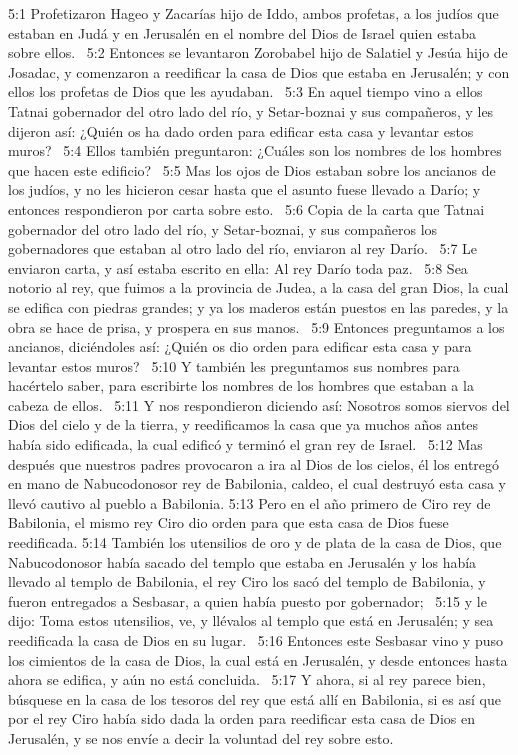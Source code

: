 5:1 Profetizaron Hageo y Zacarías hijo de Iddo, ambos profetas, a los judíos que estaban en Judá y en Jerusalén en el nombre del Dios de Israel quien estaba sobre ellos.  
5:2 Entonces se levantaron Zorobabel hijo de Salatiel y Jesúa hijo de Josadac, y comenzaron a reedificar la casa de Dios que estaba en Jerusalén; y con ellos los profetas de Dios que les ayudaban.  
5:3 En aquel tiempo vino a ellos Tatnai gobernador del otro lado del río, y Setar-boznai y sus compañeros, y les dijeron así: ¿Quién os ha dado orden para edificar esta casa y levantar estos muros?  
5:4 Ellos también preguntaron: ¿Cuáles son los nombres de los hombres que hacen este edificio?  
5:5 Mas los ojos de Dios estaban sobre los ancianos de los judíos, y no les hicieron cesar hasta que el asunto fuese llevado a Darío; y entonces respondieron por carta sobre esto.  
5:6 Copia de la carta que Tatnai gobernador del otro lado del río, y Setar-boznai, y sus compañeros los gobernadores que estaban al otro lado del río, enviaron al rey Darío.  
5:7 Le enviaron carta, y así estaba escrito en ella: Al rey Darío toda paz.  
5:8 Sea notorio al rey, que fuimos a la provincia de Judea, a la casa del gran Dios, la cual se edifica con piedras grandes; y ya los maderos están puestos en las paredes, y la obra se hace de prisa, y prospera en sus manos.  
5:9 Entonces preguntamos a los ancianos, diciéndoles así: ¿Quién os dio orden para edificar esta casa y para levantar estos muros?  
5:10 Y también les preguntamos sus nombres para hacértelo saber, para escribirte los nombres de los hombres que estaban a la cabeza de ellos.  
5:11 Y nos respondieron diciendo así: Nosotros somos siervos del Dios del cielo y de la tierra, y reedificamos la casa que ya muchos años antes había sido edificada, la cual edificó y terminó el gran rey de Israel.  
5:12 Mas después que nuestros padres provocaron a ira al Dios de los cielos, él los entregó en mano de Nabucodonosor rey de Babilonia, caldeo, el cual destruyó esta casa y llevó cautivo al pueblo a Babilonia. 
5:13 Pero en el año primero de Ciro rey de Babilonia, el mismo rey Ciro dio orden para que esta casa de Dios fuese reedificada. 
5:14 También los utensilios de oro y de plata de la casa de Dios, que Nabucodonosor había sacado del templo que estaba en Jerusalén y los había llevado al templo de Babilonia, el rey Ciro los sacó del templo de Babilonia, y fueron entregados a Sesbasar, a quien había puesto por gobernador;  
5:15 y le dijo: Toma estos utensilios, ve, y llévalos al templo que está en Jerusalén; y sea reedificada la casa de Dios en su lugar.  
5:16 Entonces este Sesbasar vino y puso los cimientos de la casa de Dios, la cual está en Jerusalén, y desde entonces hasta ahora se edifica, y aún no está concluida.  
5:17 Y ahora, si al rey parece bien, búsquese en la casa de los tesoros del rey que está allí en Babilonia, si es así que por el rey Ciro había sido dada la orden para reedificar esta casa de Dios en Jerusalén, y se nos envíe a decir la voluntad del rey sobre esto.  

